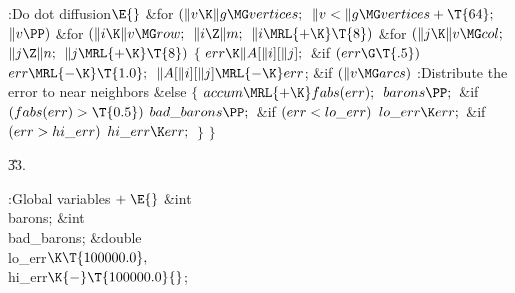 \Y\B\4:Do dot diffusion\X${}\E{}$\6
\&{for} ${}(\|v\K\|g\MG\\{vertices};{}$ ${}\|v<\|g\MG\\{vertices}+\T{64};{}$
${}\|v\PP){}$\1\6
\&{for} ${}(\|i\K\|v\MG\\{row};{}$ ${}\|i\Z\|m;{}$ ${}\|i\MRL{+{\K}}\T{8}){}$\1%
\6
\&{for} ${}(\|j\K\|v\MG\\{col};{}$ ${}\|j\Z\|n;{}$ ${}\|j\MRL{+{\K}}\T{8}){}$\5
${}\{{}$\1\6
${}\\{err}\K\|A[\|i][\|j];{}$\6
\&{if} ${}(\\{err}\G\T{.5}){}$\1\5
${}\\{err}\MRL{-{\K}}\T{1.0};{}$\2\6
${}\|A[\|i][\|j]\MRL{-{\K}}\\{err}{}$;\6
\&{if} ${}(\|v\MG\\{arcs}){}$\1\5
:Distribute the error to near neighbors\X\2\6
\&{else}\5
${}\{{}$\1\6
${}\\{accum}\MRL{+{\K}}\\{fabs}(\\{err});{}$\6
${}\\{barons}\PP;{}$\6
\&{if} ${}(\\{fabs}(\\{err})>\T{0.5}){}$\1\5
${}\\{bad\_barons}\PP;{}$\2\6
\&{if} ${}(\\{err}<\\{lo\_err}){}$\1\5
${}\\{lo\_err}\K\\{err};{}$\2\6
\&{if} ${}(\\{err}>\\{hi\_err}){}$\1\5
${}\\{hi\_err}\K\\{err};{}$\2\6
\4${}\}{}$\2\6
\4${}\}{}$\2\2\2\par
\U33.\fi

\B{}:Global variables\X${}\mathrel+\E{}$\6
\&{int} \\{barons};\6
\&{int} \\{bad\_barons};\6
\&{double} \\{lo\_err}${}\K\T{100000.0},{}$ \\{hi\_err}${}\K{-}\T{100000.0}{}$;%
\par
\fi

